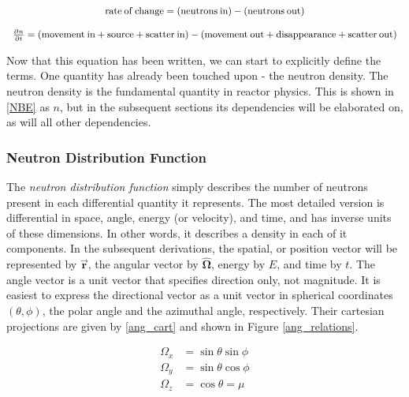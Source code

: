 \begin{equation}
\footnotesize
\label{NBE}
\begin{array}{c}
\mathrm{rate\:of\:change} = (\mathrm{neutrons\:in}) - (\mathrm{neutrons\:out}) \\
\\
\frac{\partial n}{\partial t} = ( \mathrm{movement\:in} + \mathrm{source} + \mathrm{scatter\:in}) - ( \mathrm{movement\:out} + \mathrm{disappearance} + \mathrm{scatter\:out})
\end{array}
\end{equation}

Now that this equation has been written, we can start to explicitly define the terms.  One quantity has already been touched upon - the neutron density.  The neutron density is the fundamental quantity in reactor physics.  This is shown in \eqref{NBE} as $n$, but in the subsequent sections its dependencies will be elaborated on, as will all other dependencies.


\subsubsection{Neutron Distribution Function}

The \emph{neutron distribution function} simply describes the number of neutrons present in each differential quantity it represents.  The most detailed version is differential in space, angle, energy (or velocity), and time, and has inverse units of these dimensions.  In other words, it describes a density in each of it components.  In the subsequent derivations, the spatial, or position vector will be represented by $\boldsymbol{\vec{r}}$, the angular vector by $\boldsymbol{\hat{\Omega}}$, energy by $E$, and time by $t$.  The angle vector is a unit vector that specifies direction only, not magnitude.  It is easiest to express the directional vector as a unit vector in spherical coordinates $(\theta, \phi)$, the polar angle and the azimuthal angle, respectively.  Their cartesian projections are given by \eqref{ang_cart} and shown in Figure \ref{ang_relations}.

\begin{equation}
\label{ang_cart}
\begin{split}
\Omega_x &= \sin \theta \sin \phi  \\
\Omega_y &= \sin \theta \cos \phi \\
\Omega_z &= \cos \theta = \mu
\end{split}
\end{equation}

